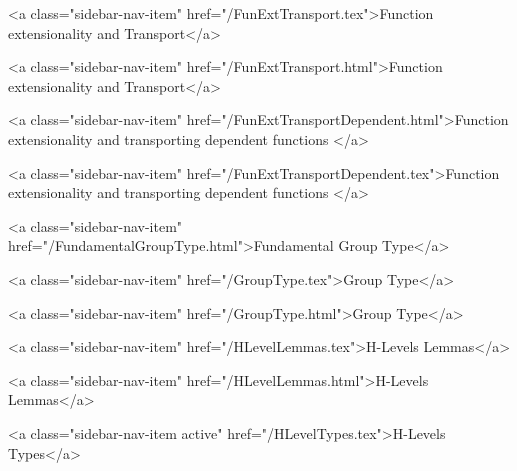       
    
      
        
          <a class="sidebar-nav-item" href="/FunExtTransport.tex">Function extensionality and Transport</a>
        
      
    
      
        
          <a class="sidebar-nav-item" href="/FunExtTransport.html">Function extensionality and Transport</a>
        
      
    
      
        
          <a class="sidebar-nav-item" href="/FunExtTransportDependent.html">Function extensionality and transporting dependent functions </a>
        
      
    
      
        
          <a class="sidebar-nav-item" href="/FunExtTransportDependent.tex">Function extensionality and transporting dependent functions </a>
        
      
    
      
        
          <a class="sidebar-nav-item" href="/FundamentalGroupType.html">Fundamental Group Type</a>
        
      
    
      
        
          <a class="sidebar-nav-item" href="/GroupType.tex">Group Type</a>
        
      
    
      
        
          <a class="sidebar-nav-item" href="/GroupType.html">Group Type</a>
        
      
    
      
        
          <a class="sidebar-nav-item" href="/HLevelLemmas.tex">H-Levels Lemmas</a>
        
      
    
      
        
          <a class="sidebar-nav-item" href="/HLevelLemmas.html">H-Levels Lemmas</a>
        
      
    
      
        
          <a class="sidebar-nav-item active" href="/HLevelTypes.tex">H-Levels Types</a>
        
      
    
